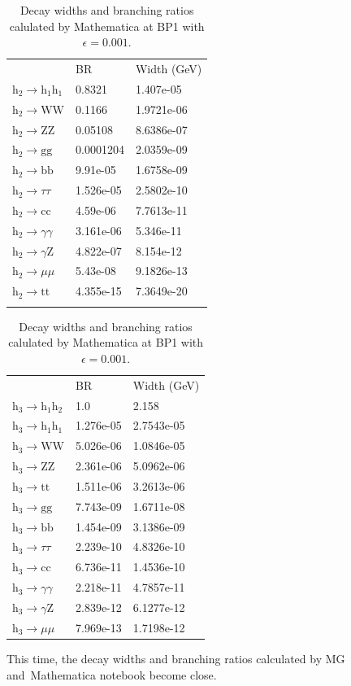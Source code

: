 \documentclass[12pt]{article}
\begin{document}
	\begin{table}[htpb]
		\centering
		\caption{Decay widths and branching ratios calulated by Mathematica at BP1 with $\epsilon=0.001$.}
		\label{tab:MA_decay_widths_BR_0001}
		\begin{tabular}{lll}
								  & BR        & Width (GeV) \\
			$\text{h}_2\to\text{h}_1\text{h}_1$ & 0.8321    & 1.407e-05   \\
			$\text{h}_2\to\text{WW}$   & 0.1166    & 1.9721e-06  \\
			$\text{h}_2\to\text{ZZ}$   & 0.05108   & 8.6386e-07  \\
			$\text{h}_2\to\text{gg}$   & 0.0001204 & 2.0359e-09  \\
			$\text{h}_2\to\text{bb}$   & 9.91e-05  & 1.6758e-09  \\
			$\text{h}_2\to\tau\tau$   & 1.526e-05 & 2.5802e-10  \\
			$\text{h}_2\to\text{cc}$   & 4.59e-06  & 7.7613e-11  \\
			$\text{h}_2\to\gamma\gamma$   & 3.161e-06 & 5.346e-11   \\
			$\text{h}_2\to\gamma\text{Z}$  & 4.822e-07 & 8.154e-12   \\
			$\text{h}_2\to\mu\mu$   & 5.43e-08  & 9.1826e-13  \\
			$\text{h}_2\to\text{tt}$   & 4.355e-15 & 7.3649e-20  \\
			\\
		\end{tabular}
		\begin{tabular}{lll}
								  & BR        & Width (GeV) \\
			$\text{h}_3\to\text{h}_1\text{h}_2$ & 1.0       & 2.158       \\
			$\text{h}_3\to\text{h}_1\text{h}_1$ & 1.276e-05 & 2.7543e-05  \\
			$\text{h}_3\to\text{WW}$   & 5.026e-06 & 1.0846e-05  \\
			$\text{h}_3\to\text{ZZ}$   & 2.361e-06 & 5.0962e-06  \\
			$\text{h}_3\to\text{tt}$   & 1.511e-06 & 3.2613e-06  \\
			$\text{h}_3\to\text{gg}$   & 7.743e-09 & 1.6711e-08  \\
			$\text{h}_3\to\text{bb}$   & 1.454e-09 & 3.1386e-09  \\
			$\text{h}_3\to\tau\tau$   & 2.239e-10 & 4.8326e-10  \\
			$\text{h}_3\to\text{cc}$   & 6.736e-11 & 1.4536e-10  \\
			$\text{h}_3\to\gamma\gamma$   & 2.218e-11 & 4.7857e-11  \\
			$\text{h}_3\to\gamma\text{Z}$   & 2.839e-12 & 6.1277e-12  \\
			$\text{h}_3\to\mu\mu$   & 7.969e-13 & 1.7198e-12  
		\end{tabular}
	\end{table}
	This time, the decay widths and branching ratios calculated by MG and Mathematica notebook become close.
\end{document}
